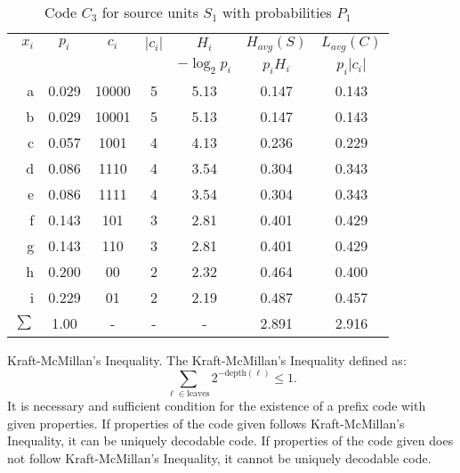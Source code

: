 \begin{table}
  \begin{center}
    \begin{tabular}{|r|cccccc|}
      \hline
      $x_i$ & $p_i$ & $c_i$ & $|c_i|$ & $H_i$ & $H_{avg}(S)$ & $L_{avg}(C)$      \\
          &        &        &          & $-\log_2 p_i$ & $p_i H_i$ & $p_i |c_i|$      \\
      \hline
      a          & 0.029   & 10000    & 5        & 5.13  & 0.147        & 0.143              \\  
      b          & 0.029   & 10001    & 5        & 5.13  & 0.147        & 0.143              \\
      c          & 0.057   & 1001     & 4        & 4.13  & 0.236        & 0.229              \\
      d          & 0.086   & 1110     & 4        & 3.54  & 0.304        & 0.343              \\
      e          & 0.086   & 1111     & 4        & 3.54  & 0.304        & 0.343              \\
      f          & 0.143   & 101      & 3        & 2.81  & 0.401        & 0.429              \\  
      g          & 0.143   & 110      & 3        & 2.81  & 0.401        & 0.429              \\
      h          & 0.200   & 00       & 2        & 2.32  & 0.464        & 0.400              \\
      i          & 0.229   & 01       & 2        & 2.19  & 0.487        & 0.457              \\
      \hline
      $\sum$     & 1.00    & -        & -        & -     & 2.891        & 2.916              \\
      \hline
    \end{tabular}
  \end{center}
  \caption{Code $C_3$ for source units $S_1$ with probabilities $P_1$}
\end{table}

\begin{dt}{Kraft-McMillan's Inequality.}
    The Kraft-McMillan's Inequality defined as: $$\sum_{\ell \in \mathrm{leaves}} 2^{-\mathrm{depth}(\ell)} \leq 1.$$
    It is necessary and sufficient condition for the existence of a prefix code with given properties. If properties of the code given follows Kraft-McMillan's Inequality, it can be uniquely decodable code. If properties of the code given does not follow Kraft-McMillan's Inequality, it cannot be uniquely decodable code.
\end{dt}

